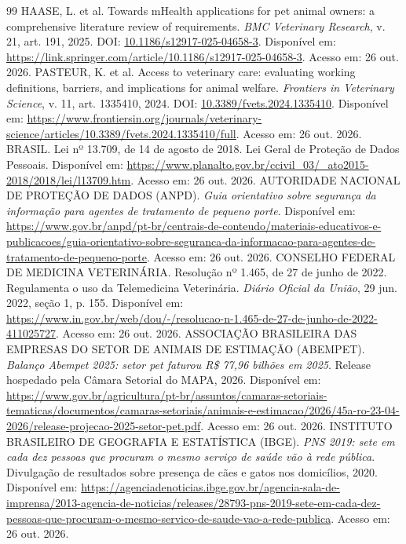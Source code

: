 \documentclass[12pt,a4paper]{article}
\begin{document}
\begin{thebibliography}{99}
 HAASE, L. et al. Towards mHealth applications for pet animal owners: a comprehensive literature review of requirements. \textit{BMC Veterinary Research}, v. 21, art. 191, 2025. DOI: \href{https://doi.org/10.1186/s12917-025-04658-3}{10.1186/s12917-025-04658-3}. Disponível em: \url{https://link.springer.com/article/10.1186/s12917-025-04658-3}. Acesso em: 26 out. 2026.
 PASTEUR, K. et al. Access to veterinary care: evaluating working definitions, barriers, and implications for animal welfare. \textit{Frontiers in Veterinary Science}, v. 11, art. 1335410, 2024. DOI: \href{https://doi.org/10.3389/fvets.2024.1335410}{10.3389/fvets.2024.1335410}. Disponível em: \url{https://www.frontiersin.org/journals/veterinary-science/articles/10.3389/fvets.2024.1335410/full}. Acesso em: 26 out. 2026.
 BRASIL. Lei nº 13.709, de 14 de agosto de 2018. Lei Geral de Proteção de Dados Pessoais. Disponível em: \url{https://www.planalto.gov.br/ccivil_03/_ato2015-2018/2018/lei/l13709.htm}. Acesso em: 26 out. 2026.
 AUTORIDADE NACIONAL DE PROTEÇÃO DE DADOS (ANPD). \textit{Guia orientativo sobre segurança da informação para agentes de tratamento de pequeno porte}. Disponível em: \url{https://www.gov.br/anpd/pt-br/centrais-de-conteudo/materiais-educativos-e-publicacoes/guia-orientativo-sobre-seguranca-da-informacao-para-agentes-de-tratamento-de-pequeno-porte}. Acesso em: 26 out. 2026.
 CONSELHO FEDERAL DE MEDICINA VETERINÁRIA. Resolução nº 1.465, de 27 de junho de 2022. Regulamenta o uso da Telemedicina Veterinária. \textit{Diário Oficial da União}, 29 jun. 2022, seção 1, p. 155. Disponível em: \url{https://www.in.gov.br/web/dou/-/resolucao-n-1.465-de-27-de-junho-de-2022-411025727}. Acesso em: 26 out. 2026.
 ASSOCIAÇÃO BRASILEIRA DAS EMPRESAS DO SETOR DE ANIMAIS DE ESTIMAÇÃO (ABEMPET). \textit{Balanço Abempet 2025: setor pet faturou R\$ 77,96 bilhões em 2025}. Release hospedado pela Câmara Setorial do MAPA, 2026. Disponível em: \url{https://www.gov.br/agricultura/pt-br/assuntos/camaras-setoriais-tematicas/documentos/camaras-setoriais/animais-e-estimacao/2026/45a-ro-23-04-2026/release-projecao-2025-setor-pet.pdf}. Acesso em: 26 out. 2026.
 INSTITUTO BRASILEIRO DE GEOGRAFIA E ESTATÍSTICA (IBGE). \textit{PNS 2019: sete em cada dez pessoas que procuram o mesmo serviço de saúde vão à rede pública}. Divulgação de resultados sobre presença de cães e gatos nos domicílios, 2020. Disponível em: \url{https://agenciadenoticias.ibge.gov.br/agencia-sala-de-imprensa/2013-agencia-de-noticias/releases/28793-pns-2019-sete-em-cada-dez-pessoas-que-procuram-o-mesmo-servico-de-saude-vao-a-rede-publica}. Acesso em: 26 out. 2026.

\end{thebibliography}
\end{document}
